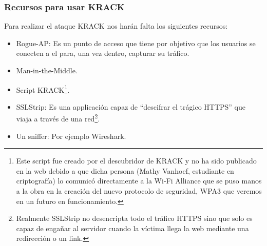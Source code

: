 \subsubsection{Recursos para usar KRACK}
Para realizar el ataque KRACK nos harán falta los siguientes recursos:
\begin{itemize}
	\item Rogue-AP: Es un punto de acceso que tiene por objetivo que los usuarios se conecten a el para, una vez dentro, capturar su tráfico.
	\item Man-in-the-Middle.
	\item Script KRACK\footnote{Este script fue creado por el descubridor de KRACK y no ha sido publicado en la web debido a que dicha persona (Mathy Vanhoef, estudiante en criptografía) lo comunicó directamente a la Wi-Fi Alliance que se puso manos a la obra en la creación del nuevo protocolo de seguridad, WPA3 que veremos en un futuro en funcionamiento.}.
	\item SSLStrip: Es una applicación capaz de ``descifrar el trágico HTTPS'' que viaja a través de una red\footnote{Realmente SSLStrip no desencripta todo el tráfico HTTPS sino que solo es capaz de engañar al servidor cuando la víctima llega la web mediante una redirección o un link.}.
	\item Un sniffer: Por ejemplo Wireshark.
\end{itemize}